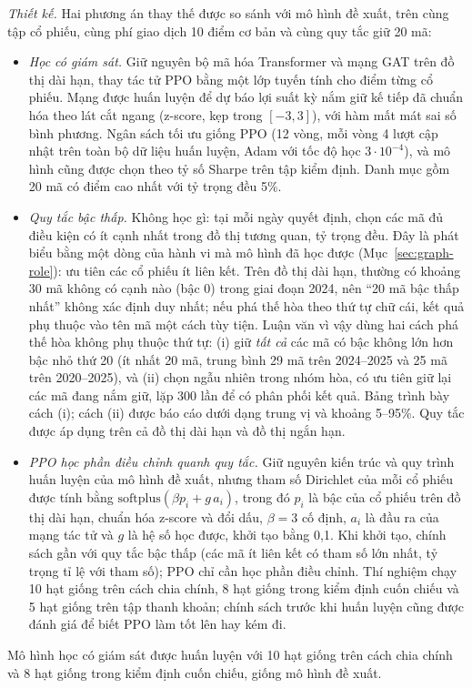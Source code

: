 \textit{Thiết kế.} Hai phương án thay thế được so sánh với mô hình đề xuất, trên cùng tập cổ phiếu, cùng phí giao dịch 10 điểm cơ bản và cùng quy tắc giữ 20 mã:
\begin{itemize}
  \item \textit{Học có giám sát.} Giữ nguyên bộ mã hóa Transformer và mạng GAT trên đồ thị dài hạn, thay tác tử PPO bằng một lớp tuyến tính cho điểm từng cổ phiếu. Mạng được huấn luyện để dự báo lợi suất kỳ nắm giữ kế tiếp đã chuẩn hóa theo lát cắt ngang (z-score, kẹp trong $[-3, 3]$), với hàm mất mát sai số bình phương. Ngân sách tối ưu giống PPO (12 vòng, mỗi vòng 4 lượt cập nhật trên toàn bộ dữ liệu huấn luyện, Adam với tốc độ học $3\cdot10^{-4}$), và mô hình cũng được chọn theo tỷ số Sharpe trên tập kiểm định. Danh mục gồm 20 mã có điểm cao nhất với tỷ trọng đều 5\%.
  \item \textit{Quy tắc bậc thấp.} Không học gì: tại mỗi ngày quyết định, chọn các mã đủ điều kiện có ít cạnh nhất trong đồ thị tương quan, tỷ trọng đều. Đây là phát biểu bằng một dòng của hành vi mà mô hình đã học được (Mục~\ref{sec:graph-role}): ưu tiên các cổ phiếu ít liên kết. Trên đồ thị dài hạn, thường có khoảng 30 mã không có cạnh nào (bậc 0) trong giai đoạn 2024, nên ``20 mã bậc thấp nhất'' không xác định duy nhất; nếu phá thế hòa theo thứ tự chữ cái, kết quả phụ thuộc vào tên mã một cách tùy tiện. Luận văn vì vậy dùng hai cách phá thế hòa không phụ thuộc thứ tự: (i) giữ \emph{tất cả} các mã có bậc không lớn hơn bậc nhỏ thứ 20 (ít nhất 20 mã, trung bình 29 mã trên 2024--2025 và 25 mã trên 2020--2025), và (ii) chọn ngẫu nhiên trong nhóm hòa, có ưu tiên giữ lại các mã đang nắm giữ, lặp 300 lần để có phân phối kết quả. Bảng trình bày cách (i); cách (ii) được báo cáo dưới dạng trung vị và khoảng 5--95\%. Quy tắc được áp dụng trên cả đồ thị dài hạn và đồ thị ngắn hạn.
  \item \textit{PPO học phần điều chỉnh quanh quy tắc.} Giữ nguyên kiến trúc và quy trình huấn luyện của mô hình đề xuất, nhưng tham số Dirichlet của mỗi cổ phiếu được tính bằng $\mathrm{softplus}(\beta p_i + g\,a_i)$, trong đó $p_i$ là bậc của cổ phiếu trên đồ thị dài hạn, chuẩn hóa z-score và đổi dấu, $\beta = 3$ cố định, $a_i$ là đầu ra của mạng tác tử và $g$ là hệ số học được, khởi tạo bằng 0,1. Khi khởi tạo, chính sách gần với quy tắc bậc thấp (các mã ít liên kết có tham số lớn nhất, tỷ trọng tỉ lệ với tham số); PPO chỉ cần học phần điều chỉnh. Thí nghiệm chạy 10 hạt giống trên cách chia chính, 8 hạt giống trong kiểm định cuốn chiếu và 5 hạt giống trên tập thanh khoản; chính sách trước khi huấn luyện cũng được đánh giá để biết PPO làm tốt lên hay kém đi.
\end{itemize}
Mô hình học có giám sát được huấn luyện với 10 hạt giống trên cách chia chính và 8 hạt giống trong kiểm định cuốn chiếu, giống mô hình đề xuất.

